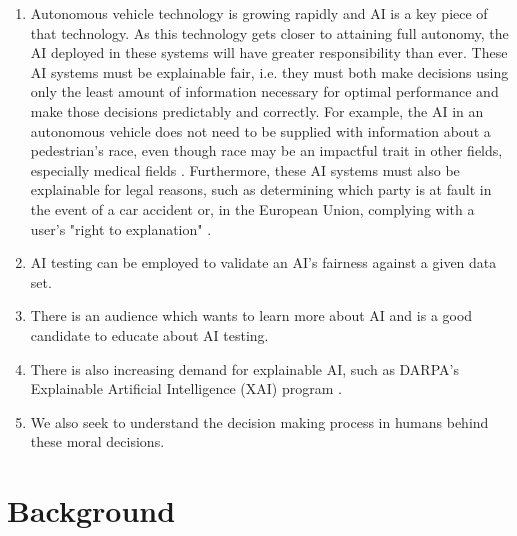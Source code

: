 \documentclass{report}
\begin{document}
\begin{enumerate}
    \item Autonomous vehicle technology is growing rapidly and AI is a key piece of that technology.
    As this technology gets closer to attaining full autonomy, the AI deployed in these systems will
    have greater responsibility than ever. These AI systems must be explainable fair, i.e. they must
    both make decisions using only the least amount of information necessary for optimal performance
    and make those decisions predictably and correctly. For example, the AI in an autonomous vehicle
    does not need to be supplied with information about a pedestrian's race, even though race may be
    an impactful trait in other fields, especially medical fields \cite{sickeCellDisease}.
    Furthermore, these AI systems must also be explainable for legal reasons, such as determining
    which party is at fault in the event of a car accident or, in the European Union, complying with
    a user's "right to explanation" \cite{goodman2017european}.
    
    \item AI testing can be employed to validate an AI's fairness against a given data set.
    
    \item There is an audience which wants to learn more about AI and is a good candidate to educate
    about AI testing.
    
    \item There is also increasing demand for explainable AI, such as DARPA's Explainable Artificial
    Intelligence (XAI) program \cite{gunning2016explainable}.
    
    \item We also seek to understand the decision making process in humans behind these moral
    decisions.
\end{enumerate}

\chapter{Background}
\end{document}
